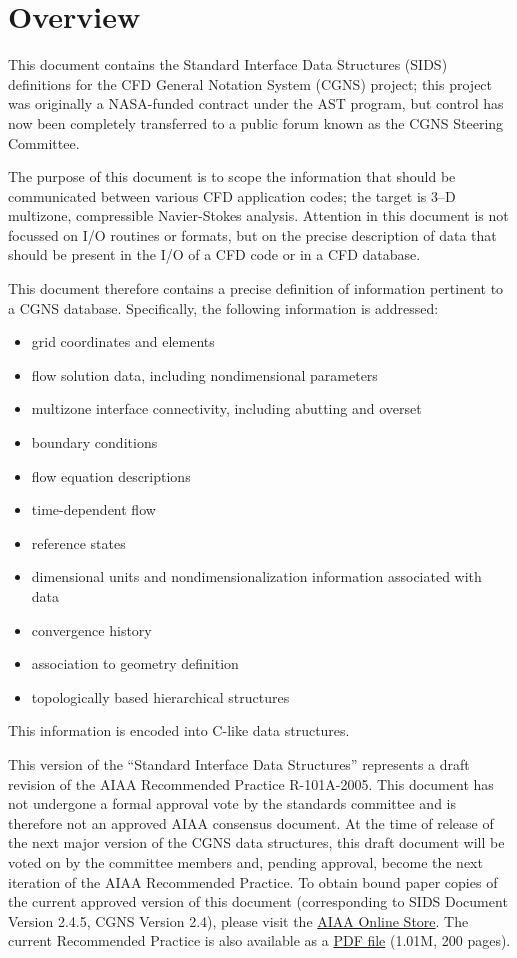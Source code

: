 \hypertarget{overview}{}
\section*{Overview}
\thispagestyle{plain}

This document contains the Standard Interface Data Structures (SIDS)
definitions for the CFD General Notation System (CGNS) project; this
project was originally a NASA-funded contract under the AST program, but
control has now been completely transferred to a public forum known as
the CGNS Steering Committee.

The purpose of this document is to scope the information that should be
communicated between various CFD application codes; the target is 3--D
multizone, compressible Navier-Stokes analysis.
Attention in this document is not focussed on I/O routines or formats,
but on the precise description of data that should be present in the I/O
of a CFD code or in a CFD database.

This document therefore contains a precise definition of information
pertinent to a CGNS database.
Specifically, the following information is addressed:
\begin{itemize}
\item grid coordinates and elements
\item flow solution data, including nondimensional parameters
\item multizone interface connectivity, including abutting and overset
\item boundary conditions
\item flow equation descriptions
\item time-dependent flow
\item reference states
\item dimensional units and nondimensionalization information associated
      with data
\item convergence history
\item association to geometry definition
\item topologically based hierarchical structures
\end{itemize}
This information is encoded into C-like data structures.

This version of the ``Standard Interface Data Structures'' represents a
draft revision of the AIAA Recommended Practice R-101A-2005.
This document has not undergone a formal approval vote by the standards
committee and is therefore not an approved AIAA consensus document.
At the time of release of the next major version of the CGNS data
structures, this draft document will be voted on by the committee
members and, pending approval, become the next iteration of the AIAA
Recommended Practice.
To obtain bound paper copies of the current approved version of this
document (corresponding to SIDS Document Version 2.4.5, CGNS Version
2.4), please visit the
\href{http://www.aiaa.org/content.cfm?pageid=363&id=1657}{AIAA
Online Store}.
The current Recommended Practice is also available as a
\href{http://www.grc.nasa.gov/www/cgns/sids/aiaa/R_101A_2005.pdf}{PDF file}
(1.01M, 200 pages).

